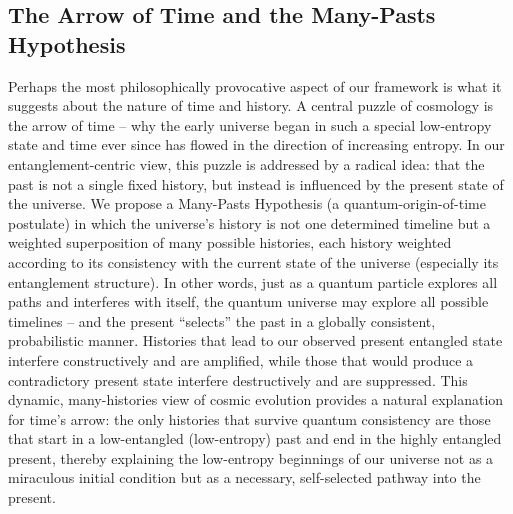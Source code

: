 \documentclass[11pt]{article}
\begin{document}
\subsection{The Arrow of Time and the Many-Pasts Hypothesis}

Perhaps the most philosophically provocative aspect of our framework is what it suggests about the nature of time and history. A central puzzle of cosmology is the arrow of time – why the early universe began in such a special low-entropy state and time ever since has flowed in the direction of increasing entropy. In our entanglement-centric view, this puzzle is addressed by a radical idea: that the past is not a single fixed history, but instead is influenced by the present state of the universe. We propose a Many-Pasts Hypothesis (a quantum-origin-of-time postulate) in which the universe’s history is not one determined timeline but a weighted superposition of many possible histories, each history weighted according to its consistency with the current state of the universe (especially its entanglement structure). In other words, just as a quantum particle explores all paths and interferes with itself, the quantum universe may explore all possible timelines – and the present “selects” the past in a globally consistent, probabilistic manner. Histories that lead to our observed present entangled state interfere constructively and are amplified, while those that would produce a contradictory present state interfere destructively and are suppressed. This dynamic, many-histories view of cosmic evolution provides a natural explanation for time’s arrow: the only histories that survive quantum consistency are those that start in a low-entangled (low-entropy) past and end in the highly entangled present, thereby explaining the low-entropy beginnings of our universe not as a miraculous initial condition but as a necessary, self-selected pathway into the present.
\end{document}
